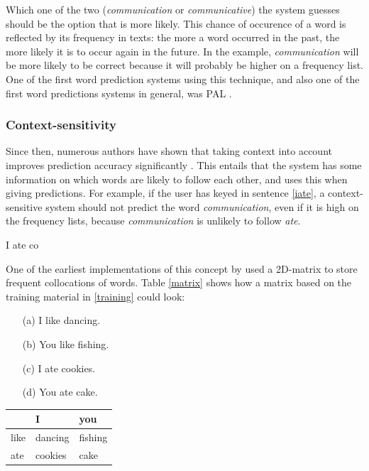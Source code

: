 \documentclass[12pt]{article}
\begin{document}
Which one of the two (\emph{communication} or \emph{communicative}) the system guesses should be the option that is more likely. This chance of occurence of a word is reflected by its frequency in texts: the more a word occurred in the past, the more likely it is to occur again in the future. In the example, \emph{communication} will be more likely to be correct because it will probably be higher on a frequency list. One of the first word prediction systems using this technique, and also one of the first word predictions systems in general, was PAL \cite{swiffin+85}. 

\subsubsection{Context-sensitivity}

Since then, numerous authors have shown that taking context into account improves prediction accuracy significantly \cite[among others]{Lesher+99,Garay-Vitoria+06,Tanaka-Ishii07,vandenbosch+08}. This entails that the system has some information on which words are likely to follow each other, and uses this when giving predictions. For example, if the user has keyed in sentence \ref{iate}, a context-sensitive system should not predict the word \emph{communication}, even if it is high on the frequency lists, because \emph{communication} is unlikely to follow \emph{ate}.

\begin{examples}
\item I ate co \label{iate}
\end{examples}

One of the earliest implementations of this concept by  used a 2D-matrix to store frequent collocations of words. Table \ref{matrix} shows how a matrix based on the training material in \ref{training} could look:

\begin{examples}

\item 

\begin{itemize} \label{training}
\item[(a)] I like dancing.
\item[(b)] You like fishing.
\item[(c)] I ate cookies.
\item[(d)] You ate cake.
\end{itemize}

\item \begin{tabular}{l|ll}
&I&you\\
\hline
like&dancing&fishing\\
ate&cookies&cake\\
\end{tabular} \label{matrix}

\end{examples}
\end{document}
